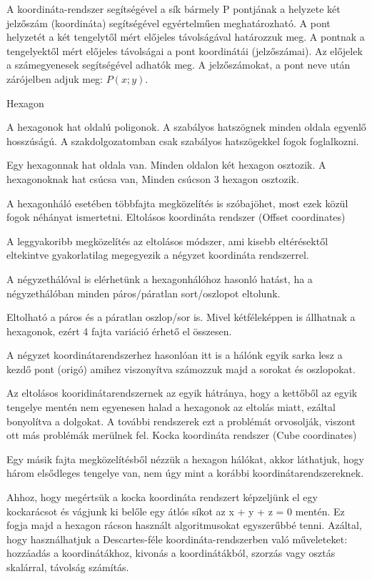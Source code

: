 A koordináta-rendszer segítségével a sík bármely P pontjának a helyzete két jelzőszám (koordináta) segítségével egyértelműen meghatározható. A pont helyzetét a két tengelytől mért előjeles távolságával határozzuk meg. A pontnak a tengelyektől mért előjeles távolságai a pont koordinátái (jelzőszámai). Az előjelek a számegyenesek segítségével adhatók meg. A jelzőszámokat, a pont neve után zárójelben adjuk meg: $P(x;y)$.

Hexagon

A hexagonok hat oldalú poligonok. A szabályos hatszögnek minden oldala egyenlő hosszúságú. A szakdolgozatomban csak szabályos hatszögekkel fogok foglalkozni. 

Egy hexagonnak hat oldala van. Minden oldalon két hexagon osztozik. A hexagonoknak hat csúcsa van, Minden csúcson 3 hexagon osztozik.

A hexagonháló esetében többfajta megközelítés is szóbajöhet, most ezek közül fogok néhányat ismertetni. 
Eltolásos koordináta rendszer (Offset coordinates)

	A leggyakoribb megközelítés az eltolásos módszer, ami kisebb eltérésektől eltekintve gyakorlatilag megegyezik a négyzet koordináta rendszerrel. 

A négyzethálóval is elérhetünk a hexagonhálóhoz hasonló hatást, ha a négyzethálóban minden páros/páratlan sort/oszlopot eltolunk.

Eltolható a páros és a páratlan oszlop/sor is. Mivel kétféleképpen is állhatnak a hexagonok, ezért 4 fajta variáció érhető el összesen.

A négyzet koordinátarendszerhez hasonlóan itt is a hálónk egyik sarka lesz a kezdő pont (origó) amihez viszonyítva számozzuk majd a sorokat és oszlopokat.

Az eltolásos kooridinátarendszernek az egyik hátránya, hogy a kettőből az egyik tengelye mentén nem egyenesen halad a hexagonok az eltolás miatt, ezáltal bonyolítva a dolgokat. A további rendszerek ezt a problémát orvosolják, viszont ott más problémák merülnek fel.		
Kocka koordináta rendszer (Cube coordinates)

Egy másik fajta megközelítésből nézzük a hexagon hálókat, akkor láthatjuk, hogy három elsődleges tengelye van, nem úgy mint a korábbi koordinátarendszereknek. 

Ahhoz, hogy megértsük a kocka koordináta rendszert képzeljünk el egy kockarácsot és vágjunk ki belőle egy átlós síkot az x + y + z = 0 mentén. Ez fogja majd a hexagon rácson használt algoritmusokat egyszerűbbé tenni. Azáltal, hogy használhatjuk a Descartes-féle koordináta-rendszerben való műveleteket: hozzáadás a koordinátákhoz, kivonás a koordinátákból, szorzás vagy osztás skalárral, távolság számítás.

